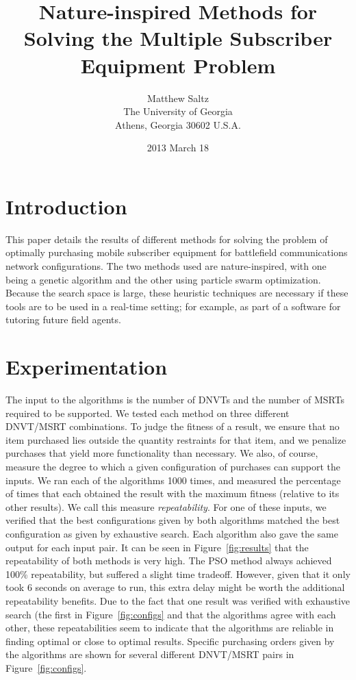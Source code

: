 \documentclass[12pt,fleqn]{article}
\title{\bf Nature-inspired Methods for Solving the Multiple Subscriber Equipment Problem}
\author{Matthew Saltz \\
        The University of Georgia \\
        Athens, Georgia 30602 U.S.A.}
\date{2013 March 18}
\begin{document}
\maketitle
\section{Introduction}
This paper details the results of different methods for solving the problem of optimally purchasing
mobile subscriber equipment for battlefield communications network configurations.  
The two methods used are nature-inspired, with one being a genetic algorithm and the 
other using particle swarm optimization.  Because the search space is large, these
heuristic techniques are necessary if these tools are to be used in a real-time setting;
for example, as part of a software for tutoring future field agents.  
\section{Experimentation}    
The input to the algorithms is the number of DNVTs and the number of MSRTs required to be supported. We tested each method on three different DNVT/MSRT combinations. To judge the fitness of a result, we ensure that no item purchased lies outside the quantity restraints for that item, and we penalize purchases that yield more functionality than necessary.  We also, of course, measure the degree to which a given configuration of purchases can support the inputs. We ran each of the
algorithms 1000 times, and measured the percentage of times that each obtained the result with the maximum fitness (relative to its other results). We call this measure {\em repeatability}. For one of these inputs, we verified that the best configurations given by both algorithms 
matched the best configuration as given by exhaustive search. Each algorithm also gave the same output for each input pair. It can be seen in Figure~\ref{fig:results} that the repeatability of both methods is very high.  The PSO method always achieved 100\% repeatability, but suffered a slight time tradeoff.  However, given that it only took 6 seconds on average to run, this extra delay might be worth the additional repeatability benefits.  Due to the fact that one result
was verified with exhaustive search (the first in Figure~\ref{fig:configs} and that the algorithms agree with each other, these repeatabilities seem
to indicate that the algorithms are reliable in finding optimal or close to optimal results. Specific purchasing orders given by the algorithms are shown for several different DNVT/MSRT pairs in Figure~\ref{fig:configs}. 
\end{document}

